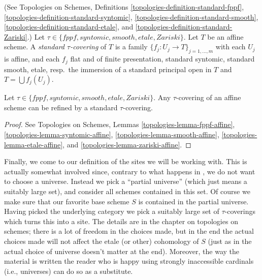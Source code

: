 \begin{definition}
\label{definition-standard-tau}
(See Topologies on Schemes, Definitions
\ref{topologies-definition-standard-fppf},
\ref{topologies-definition-standard-syntomic},
\ref{topologies-definition-standard-smooth},
\ref{topologies-definition-standard-etale}, and
\ref{topologies-definition-standard-Zariski}.)
Let $\tau \in \{fppf, syntomic, smooth, etale, Zariski\}$.
Let $T$ be an affine scheme.
A {\it standard $\tau$-covering} of $T$ is a family
$\{f_j : U_j \to T\}_{j = 1, \ldots, m}$ with each $U_j$ is affine,
and each $f_j$ flat and of finite presentation, 
standard syntomic, standard smooth, etale, resp.\ the immersion of a
standard principal open in $T$ and $T = \bigcup f_j(U_j)$.
\end{definition}

\begin{lemma}
\label{lemma-tau-affine}
Let $\tau \in \{fppf, syntomic, smooth, etale, Zariski\}$.
Any $\tau$-covering of an affine scheme can be refined by a 
standard $\tau$-covering.
\end{lemma}

\begin{proof}
See Topologies on Schemes, Lemmas
\ref{topologies-lemma-fppf-affine},
\ref{topologies-lemma-syntomic-affine},
\ref{topologies-lemma-smooth-affine},
\ref{topologies-lemma-etale-affine}, and
\ref{topologies-lemma-zariski-affine}.
\end{proof}

\noindent
Finally, we come to our definition of the sites we will be working with.
This is actually somewhat involved since, contrary to what happens in
\cite{SGA4}, we do not want to choose a universe. Instead we pick a ``partial
universe'' (which just means a suitably large set), and consider all schemes
contained in this set. Of course we make sure that our favorite base scheme
$S$ is contained in the partial universe. Having picked the underlying category
we pick a suitably large set of $\tau$-coverings which turns this into a site.
The details are in the chapter on topologies on schemes; there is a lot of
freedom in the choices made, but in the end the actual choices made will not
affect the etale (or other) cohomology of $S$ (just as in \cite{SGA4} the
actual choice of universe doesn't matter at the end). Moreover, the way the
material is written the reader who is happy using strongly inaccessible
cardinals (i.e., universes) can do so as a substitute.

